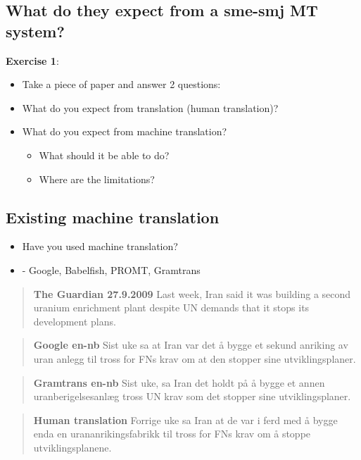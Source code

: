 \documentclass[a4paper,english,12pt]{article}
\begin{document}
\subsection{What do they expect from a sme-smj MT system?}
{\bf Exercise 1}:\\
\begin{itemize}
\item Take a piece of paper and answer 2 questions:
\item What do you expect from translation (human translation)?
\item What do you expect from machine translation?
    \begin{itemize}
        \item What should it be able to do?
        \item Where are the limitations?
    \end{itemize}
\end{itemize}

\subsection{Existing machine translation}

\begin{itemize}
    \item Have you used machine translation? 
    \item - Google, Babelfish, PROMT, Gramtrans
\end{itemize}

\begin{quote}
{\bf The Guardian 27.9.2009}
Last week, Iran said it was building a second uranium enrichment plant despite UN demands that it stops its development plans.
\end{quote}

\begin{quote}
{\bf Google en-nb}
Sist uke sa at Iran var det å bygge et sekund anriking av uran anlegg til tross for FNs krav om at den stopper sine utviklingsplaner.
\end{quote}

\begin{quote}
{\bf Gramtrans en-nb}
Sist uke, sa Iran det holdt på å bygge et annen uranberigelsesanlæg tross UN krav som det stopper sine utviklingsplaner.
\end{quote}

\begin{quote}
{\bf Human translation}
Forrige uke sa Iran at de var i ferd med å bygge enda en urananrikingsfabrikk til tross for FNs krav om å stoppe utviklingsplanene.
\end{quote}
\end{document}
